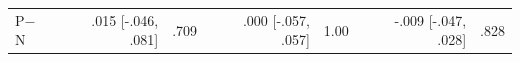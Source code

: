 \documentclass[letterpaper]{article} %
\begin{document}
\begin{table}[t!]
\begin{tabular}{@{}l rr rr rr@{}}
P$-$N & .015 [-.046, .081] & .709 & .000 [-.057, .057] & 1.00 & -.009 [-.047, .028] & .828\\ %

\end{tabular}
\end{table}
\end{document}
